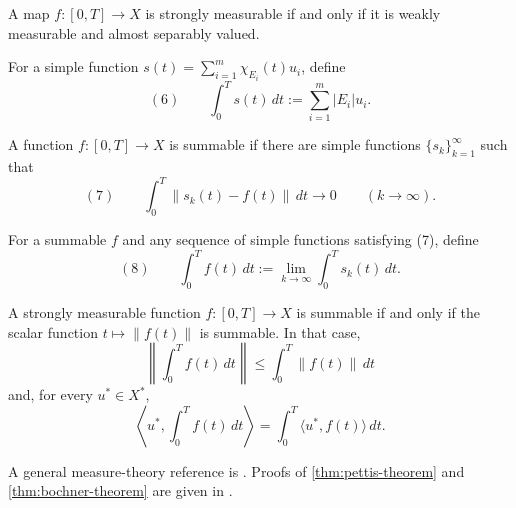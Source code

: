 \begin{theorem}[Pettis]
\label{thm:pettis-theorem}

A map $f:[0,T]\to X$ is strongly measurable if and only if it is weakly
measurable and almost separably valued.
\end{theorem}

\begin{definition}
\label{def:integral-of-simple-function}

For a simple function $s(t)=\sum_{i=1}^m\chi_{E_i}(t)u_i$, define
\[
(6)\qquad
\int_0^T s(t)\,dt:=\sum_{i=1}^m|E_i|u_i.
\]
\end{definition}

\begin{definition}
\label{def:summable-banach-valued-function}

A function $f:[0,T]\to X$ is summable if there are simple functions
$\{s_k\}_{k=1}^\infty$ such that
\[
(7)\qquad
\int_0^T\|s_k(t)-f(t)\|\,dt\to0
\qquad(k\to\infty).
\]
\end{definition}

\begin{definition}
\label{def:bochner-integral}

For a summable $f$ and any sequence of simple functions satisfying (7), define
\[
(8)\qquad
\int_0^T f(t)\,dt:=\lim_{k\to\infty}\int_0^T s_k(t)\,dt.
\]
\end{definition}

\begin{theorem}[Bochner]
\label{thm:bochner-theorem}

A strongly measurable function $f:[0,T]\to X$ is summable if and only if the
scalar function $t\mapsto\|f(t)\|$ is summable. In that case,
\[
\left\|\int_0^T f(t)\,dt\right\|
\leq\int_0^T\|f(t)\|\,dt
\]
and, for every $u^*\in X^*$,
\[
\left\langle u^*,\int_0^T f(t)\,dt\right\rangle
=\int_0^T\langle u^*,f(t)\rangle\,dt.
\]
\end{theorem}

A general measure-theory reference is \cite{Folland1984}. Proofs of
\cref{thm:pettis-theorem} and \cref{thm:bochner-theorem} are given in
\cite[Chapter V, Sections 4--5]{Yosida1980}.
